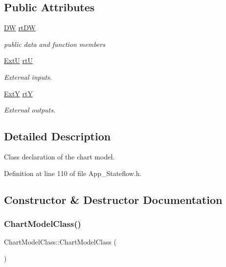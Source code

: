 \subsection*{Public Attributes}
\begin{DoxyCompactItemize}
\item 
\mbox{\hyperlink{struct_d_w}{DW}} \mbox{\hyperlink{class_chart_model_class_a1c2dcf4c77e74c040501b76bd18eebf8}{rt\+DW}}
\begin{DoxyCompactList}\small\item\em public data and function members \end{DoxyCompactList}\item 
\mbox{\hyperlink{struct_ext_u}{ExtU}} \mbox{\hyperlink{class_chart_model_class_aa557038e416c73872f813e4206084532}{rtU}}
\begin{DoxyCompactList}\small\item\em External inputs. \end{DoxyCompactList}\item 
\mbox{\hyperlink{struct_ext_y}{ExtY}} \mbox{\hyperlink{class_chart_model_class_ac7425d26c91af4aaed697e7ac65b46fa}{rtY}}
\begin{DoxyCompactList}\small\item\em External outputs. \end{DoxyCompactList}\end{DoxyCompactItemize}


\subsection{Detailed Description}
Class declaration of the chart model. 

Definition at line 110 of file App\+\_\+\+Stateflow.\+h.



\subsection{Constructor \& Destructor Documentation}
\mbox{\label{class_chart_model_class_ac943318da1975acdd0bee749a1372c47}} 
\subsubsection{\texorpdfstring{Chart\+Model\+Class()}{ChartModelClass()}}
{\footnotesize\ttfamily Chart\+Model\+Class\+::\+Chart\+Model\+Class (\begin{DoxyParamCaption}{ }\end{DoxyParamCaption})}



